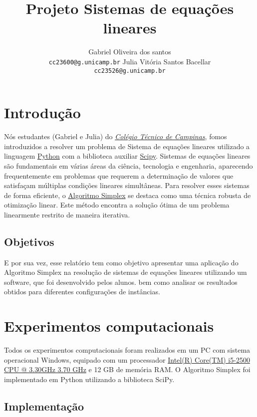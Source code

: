 \documentclass[11pt]{article}
\title{Projeto Sistemas de equações lineares}
\author{Gabriel Oliveira dos santos \\ \texttt{cc23600@g.unicamp.br} \And Julia Vitória Santos Bacellar \\ \texttt{cc23526@g.unicamp.br}}
\theoremstyle{definition} \newtheorem{definition}{Definição}
\theoremstyle{definition} \newtheorem{example}{Exemplo}
\begin{document}
\maketitle

\section{Introdução}

{Nós estudantes (Gabriel e Julia) do \textit{\href{https://cotuca.unicamp.br/}{Colégio Técnico de Campinas}}, fomos introduzidos a resolver um problema de Sistema de equações lineares utilizado a linguagem \href{https://www.python.org/}{Python} com a biblioteca auxiliar \href{https://scipy.org/}{Scipy}.}
{Sistemas de equações lineares são fundamentais em várias áreas da ciência, tecnologia e engenharia, aparecendo frequentemente em problemas que requerem a determinação de valores que satisfaçam múltiplas condições lineares simultâneas. Para resolver esses sistemas de forma eficiente, o \href{https://pt.wikipedia.org/wiki/Algoritmo_simplex}{Algoritmo Simplex} se destaca como uma técnica robusta de otimização linear. Este método encontra a solução ótima de um problema linearmente restrito de maneira iterativa.}

\subsection{Objetivos}

{E por sua vez, esse relatório tem como objetivo apresentar uma aplicação do Algoritmo Simplex na resolução de sistemas de equações lineares utilizando um software, que foi desenvolvido pelos alunos. bem como analisar os resultados obtidos para diferentes configurações de instâncias.}

\section{Experimentos computacionais}

{Todos os experimentos computacionais foram realizados em um PC com sistema operacional Windows, equipado com um processador \href{https://www.intel.com.br/content/www/br/pt/products/sku/52209/intel-core-i52500-processor-6m-cache-up-to-3-70-ghz/specifications.html}{Intel(R) Core(TM) i5-2500 CPU @ 3.30GHz 3.70 GHz} e 12 GB de memória RAM. O Algoritmo Simplex foi implementado em Python utilizando a biblioteca SciPy.}

\subsection{Implementação}
\end{document}
